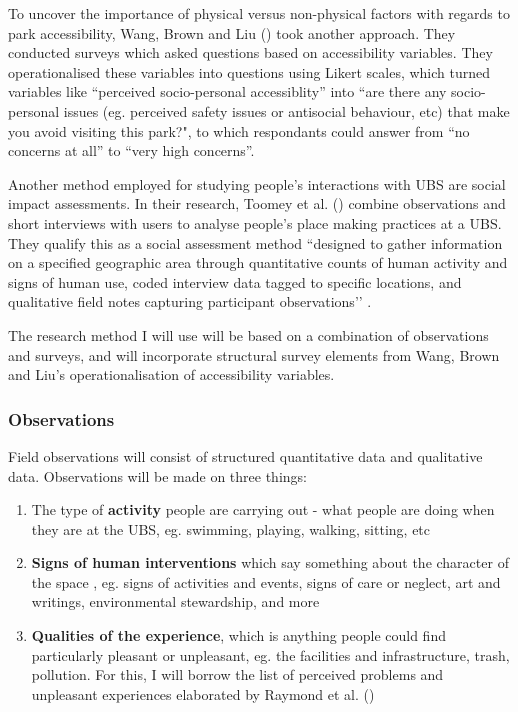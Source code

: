 \documentclass{article}
\begin{document}
To uncover the importance of physical versus non-physical factors with regards to park accessibility, Wang, Brown and Liu (\citeyear{wang2015physical}) took another approach. They conducted surveys which asked questions based on accessibility variables. They operationalised these variables into questions using Likert scales, which turned variables like ``perceived socio-personal accessiblity'' into ``are there any socio-personal issues (eg. perceived safety issues or antisocial behaviour, etc) that make you avoid visiting this park?", to which respondants could answer from ``no concerns at all'' to ``very high concerns''.

Another method employed for studying people’s interactions with UBS are social impact assessments. In their research, Toomey et al. (\citeyear{toomey2021place}) combine observations and short interviews with users to analyse people’s place making practices at a UBS. They qualify this as a social assessment method ``designed to gather information on a specified geographic area through quantitative counts of human activity and signs of human use, coded interview data tagged to specific locations, and qualitative field notes capturing participant observations’’ \parencite{toomey2021place}.
 
The research method I will use will be based on a combination of observations and surveys, and will incorporate structural survey elements from Wang, Brown and Liu's operationalisation of accessibility variables. 

\subsubsection{Observations}

Field observations will consist of structured quantitative data and qualitative data. Observations will be made on three things:

\begin{enumerate}
	\item The type of \textbf{activity} people are carrying out - what people are doing when they are at the UBS, eg. swimming, playing, walking, sitting, etc
	\item \textbf{Signs of human interventions} which say something about the character of the space , eg. signs of activities and events, signs of care or neglect, art and writings, environmental stewardship, and more
	\item \textbf{Qualities of the experience}, which is anything people could find particularly pleasant or unpleasant, eg. the facilities and infrastructure, trash, pollution. For this, I will borrow the list of perceived problems and unpleasant experiences elaborated by Raymond et al. (\citeyear{raymond2016integrating})
\end{enumerate}
\end{document}
